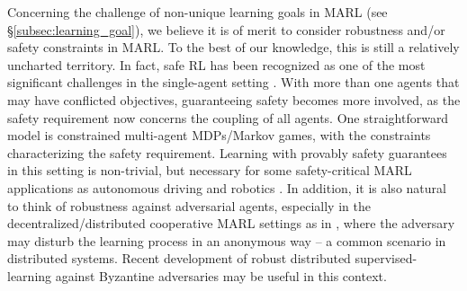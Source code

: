 \vspace{6pt}
\vspace{3pt}
Concerning the challenge of non-unique learning goals in MARL (see \S\ref{subsec:learning_goal}), we believe it is of merit to consider robustness and/or safety constraints in MARL. To the best of our knowledge, this is still a relatively uncharted territory. In fact, safe RL has been recognized as one of the most significant challenges  in the single-agent setting \cite{garcia2015comprehensive}. With more than one agents that may have conflicted objectives, guaranteeing  safety   becomes more involved, as the safety requirement now concerns the coupling of all  agents. One straightforward model is constrained multi-agent MDPs/Markov games, with the constraints characterizing the safety requirement. Learning with provably safety guarantees in this setting is non-trivial, but  necessary for some safety-critical MARL applications as autonomous driving \cite{shalev2016safe} and robotics \cite{kober2013reinforcement}. In addition, it is also natural to think of  robustness against adversarial agents, especially in the decentralized/distributed cooperative MARL settings as in \cite{zhang2018fully,chen2018communication,wai2018multi}, where the adversary may disturb the learning process in an anonymous way -- a common scenario  in distributed systems. Recent development of robust distributed supervised-learning against Byzantine adversaries  \cite{chen2017distributed,yin2018byzantine} may be useful  in this context.  



